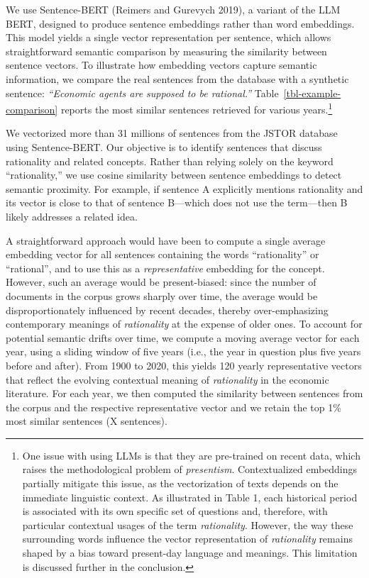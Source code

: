 \documentclass[
]{interact}
\begin{document}
We use Sentence-BERT (Reimers and Gurevych 2019), a variant of the LLM
BERT, designed to produce sentence embeddings rather than word
embeddings. This model yields a single vector representation per
sentence, which allows straightforward semantic comparison by measuring
the similarity between sentence vectors. To illustrate how embedding
vectors capture semantic information, we compare the real sentences from
the database with a synthetic sentence: \emph{``Economic agents are
supposed to be rational.''} Table~\ref{tbl-example-comparison} reports
the most similar sentences retrieved for various years.\footnote{One
  issue with using LLMs is that they are pre-trained on recent data,
  which raises the methodological problem of \emph{presentism}.
  Contextualized embeddings partially mitigate this issue, as the
  vectorization of texts depends on the immediate linguistic context. As
  illustrated in Table 1, each historical period is associated with its
  own specific set of questions and, therefore, with particular
  contextual usages of the term \emph{rationality}. However, the way
  these surrounding words influence the vector representation of
  \emph{rationality} remains shaped by a bias toward present-day
  language and meanings. This limitation is discussed further in the
  conclusion.}

We vectorized more than 31 millions of sentences from the JSTOR database
using Sentence-BERT. Our objective is to identify sentences that discuss
rationality and related concepts. Rather than relying solely on the
keyword ``rationality,'' we use cosine similarity between sentence
embeddings to detect semantic proximity. For example, if sentence A
explicitly mentions rationality and its vector is close to that of
sentence B---which does not use the term---then B likely addresses a
related idea.

A straightforward approach would have been to compute a single average
embedding vector for all sentences containing the words ``rationality''
or ``rational'', and to use this as a \emph{representative} embedding
for the concept. However, such an average would be present-biased: since
the number of documents in the corpus grows sharply over time, the
average would be disproportionately influenced by recent decades,
thereby over-emphasizing contemporary meanings of \emph{rationality} at
the expense of older ones. To account for potential semantic drifts over
time, we compute a moving average vector for each year, using a sliding
window of five years (i.e., the year in question plus five years before
and after). From 1900 to 2020, this yields 120 yearly representative
vectors that reflect the evolving contextual meaning of
\emph{rationality} in the economic literature. For each year, we then
computed the similarity between sentences from the corpus and the
respective representative vector and we retain the top 1\% most similar
sentences (X sentences).
\end{document}
